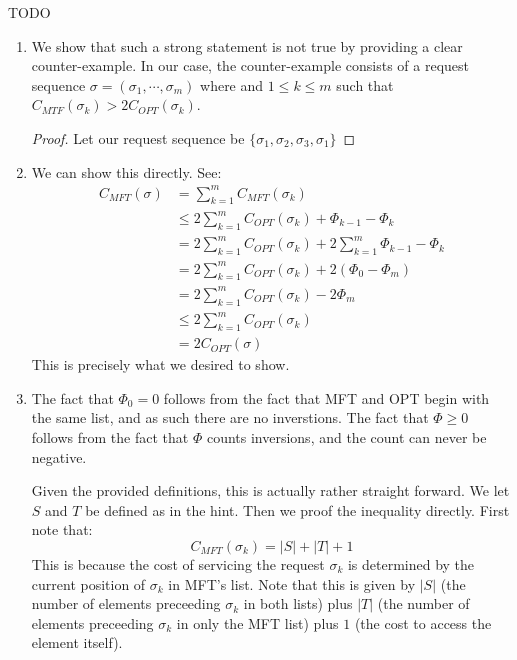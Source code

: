 \documentclass[12pt]{exam}
\newcommand{\Q}[1]{\question{\large{\textbf{#1}}}}
\begin{document}
\begin{questions}
\begin{solution}
\begin{enumerate}[label=(\alph*)]
      TODO


  \end{enumerate}
\end{solution}


\newpage
\Q{Problem 17}
\begin{solution}
  \begin{enumerate}[label=(\alph*)]
    \item We show that such a strong statement is not true by providing a clear counter-example. In our case, the counter-example consists of a request sequence $\sigma = (\sigma_1, \cdots, \sigma_m)$ where and $1 \leq k \leq m$ such that $C_{MTF}(\sigma_k) > 2 C_{OPT}(\sigma_k)$.

    \begin{proof}
      Let our request sequence be $\{ \sigma_1, \sigma_2, \sigma_3, \sigma_1 \}$
    \end{proof}

  \item 
    We can show this directly. See:
    \begin{align*}
      C_{MFT}(\sigma) &= \sum_{k=1}^m C_{MFT}(\sigma_k) \tag{Definition} \\
      &\leq 2 \sum_{k=1}^m C_{OPT}(\sigma_k) + \Phi_{k-1} - \Phi_k \tag{Equation (2) given}  \\
      &= 2\sum_{k=1}^m C_{OPT}(\sigma_k) + 2\sum_{k=1}^m \Phi_{k-1} - \Phi_k \\
      &= 2\sum_{k=1}^m C_{OPT}(\sigma_k) + 2(\Phi_0 - \Phi_m) \tag{Telescoping sum} \\
      &= 2\sum_{k=1}^m C_{OPT}(\sigma_k) - 2\Phi_m \tag{$Phi_0 = 0$} \\
      &\leq 2 \sum_{k=1}^m C_{OPT}(\sigma_k) \tag{$\Phi_m \geq 0$} \\
      &= 2C_{OPT}(\sigma) \tag{Definition}
    \end{align*}
    This is precisely what we desired to show.

    \item
      The fact that $\Phi_0 = 0$ follows from the fact that MFT and OPT begin with the same list, and as such there are no inverstions. The fact that $\Phi \geq 0$ follows from the fact that $\Phi$ counts inversions, and the count can never be negative.

      Given the provided definitions, this is actually rather straight forward. We let $S$ and $T$ be defined as in the hint. Then we proof the inequality directly. First note that:
      \[
        C_{MFT}(\sigma_k) = |S| + |T| + 1
      \]
      This is because the cost of servicing the request $\sigma_k$ is determined by the current position of $\sigma_k$ in MFT's list. Note that this is given by $|S|$ (the number of elements preceeding $\sigma_k$ in both lists) plus $|T|$ (the number of elements preceeding $\sigma_k$ in only the MFT list) plus $1$ (the cost to access the element itself).


\end{enumerate}
\end{solution}
\end{questions}
\end{document}
